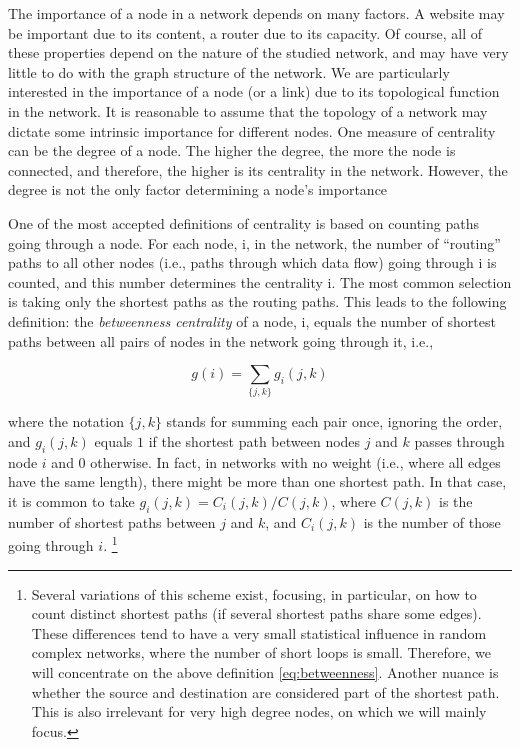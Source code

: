 The importance of a node in a network depends on many factors. A website may be important due to its content, a router due to its capacity. Of course, all of these properties depend on the nature
of the studied network, and may have very little to do with the graph structure of the network. We are particularly interested in the importance of a node (or a link) due to its topological  function in the network. It is reasonable to assume that the topology of a network may dictate some intrinsic importance for different nodes. One measure of centrality can be the degree of a
node. The higher the degree, the more the node is connected, and therefore, the higher is its centrality in the network. However, the degree is not the only factor determining a node's importance \s

\nd One of the most accepted definitions of centrality is based on counting paths going through a node. For each node, i, in the network, the number of “routing” paths to all other nodes (i.e., paths through which data flow) going through i is counted, and this number determines the centrality i. The most common selection is taking only
the shortest paths as the routing paths. This leads to the following definition: the \emph{betweenness centrality} of a node, i, equals the number of shortest paths between all pairs of nodes in the network going through it, i.e.,

\begin{equation} \label{eq:betweenness}
    g(i) = \sum_{\{ j,k \}} g_i (j,k)
\end{equation}

\nd where the notation $\{j, k\}$ stands for summing each pair once, ignoring the order, and $g_i(j, k)$ equals $1$ if the shortest path between nodes $j$ and $k$ passes through node $i$ and $0$ otherwise. In fact, in networks with no weight (i.e., where all edges have the same length), there might be more than one shortest path. In that case, it is common to take $g_i(j, k) = C_i(j,k)/C(j,k)$, where $C(j,k)$ is the number of shortest paths between
$j$ and $k$, and $C_i(j,k)$ is the number of those going through $i$. \footnote{Several variations of
this scheme exist, focusing, in particular, on how to count distinct shortest paths (if several shortest paths share some edges). These differences tend to have a very small statistical influence in random complex networks, where the number of short loops is small. Therefore, we will concentrate on the above definition \ref{eq:betweenness}. Another nuance is whether the source and destination are considered part of the shortest path.
This is also irrelevant for very high degree nodes, on which we will mainly focus.} \s

